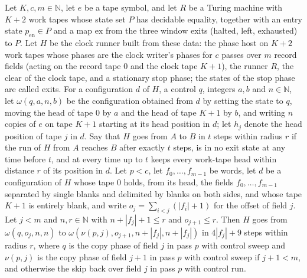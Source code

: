 \begin{lemma}
\label{Turing.cw_round}
\leanok
{}
Let $K,c,m\in\mathbb{N}$, let $e$ be a tape symbol, and let $R$ be a Turing machine with $K+2$
work tapes whose state set $P$ has decidable equality, together with an entry state
$p_{\mathrm{en}}\in P$ and a map $\mathrm{ex}$ from the three window exits (halted, left,
exhausted) to $P$. Let $H$ be the clock runner built from these data: the phase host on $K+2$
work tapes whose phases are the clock writer's phases for $c$ passes over $m$ record fields
(acting on the record tape $0$ and the clock tape $K+1$), the runner $R$, the clear of the
clock tape, and a stationary stop phase; the states of the stop phase are called exits. For a
configuration $d$ of $H$, a control $q$, integers $a,b$ and $n\in\mathbb{N}$, let
$\omega(q,a,n,b)$ be the configuration obtained from $d$ by setting the state to $q$, moving
the head of tape $0$ by $a$ and the head of tape $K+1$ by $b$, and writing $n$ copies of $e$ on
tape $K+1$ starting at its head position in $d$; let $h_j$ denote the head position of tape $j$
in $d$. Say that $H$ goes from $A$ to $B$ in $t$ steps within radius $r$ if the run of $H$ from
$A$ reaches $B$ after exactly $t$ steps, is in no exit state at any time before $t$, and at
every time up to $t$ keeps every work-tape head within distance $r$ of its position in $d$. Let
$p<c$, let $f_0,\dots,f_{m-1}$ be words, let $d$ be a configuration of $H$ whose tape $0$
holds, from its head, the fields $f_0,\dots,f_{m-1}$ separated by single blanks and delimited
by blanks on both sides, and whose tape $K+1$ is entirely blank, and write
$o_j=\sum_{i<j}(|f_i|+1)$ for the offset of field $j$. Let $j<m$ and $n,r\in\mathbb{N}$ with
$n+|f_j|+1\le r$ and $o_{j+1}\le r$. Then $H$ goes from $\omega(q,o_j,n,n)$ to
$\omega(\nu(p,j),o_{j+1},n+|f_j|,n+|f_j|)$ in $4|f_j|+9$ steps within radius $r$, where $q$ is
the copy phase of field $j$ in pass $p$ with control sweep and $\nu(p,j)$ is the copy phase of
field $j+1$ in pass $p$ with control sweep if $j+1<m$, and otherwise the skip back over field
$j$ in pass $p$ with control run.
\end{lemma}

